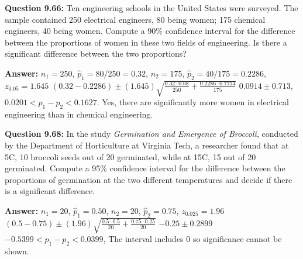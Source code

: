 \documentclass{article}
\begin{document}
\textbf{Question 9.66:}
Ten engineering schools in the United States
were surveyed. The sample contained 250 electrical
engineers, 80 being women; 175 chemical engineers, 40
being women. Compute a 90\% confidence interval for
the difference between the proportions of women in
these two fields of engineering. Is there a significant
difference between the two proportions?
\begin{description}
    \item \textbf{Answer:} $n_1=250$, $\hat{p}_1=80/250=0.32$, $n_2=175$, $\hat{p}_2=40/175=0.2286$, $z_{0.05}=1.645$\newline
    $(0.32-0.2286)\pm(1.645)\sqrt{\frac{0.32\cdot 0.68}{250}+\frac{0.2286\cdot 0.7714}{175}}$\newline
    $0.0914\pm 0.713$, \newline
    \boldmath$0.0201 < p_1 - p_2 < 0.1627$. Yes, there are significantly more women
    in electrical engineering than in chemical engineering.
\end{description}

\textbf{Question 9.68:}
In the study \textit{Germination and Emergence of
Broccoli}, conducted by the Department of Horticulture
at Virginia Tech, a researcher found that at 5\textdegree C, 10
broccoli seeds out of 20 germinated, while at 15\textdegree C, 15
out of 20 germinated. Compute a 95\% confidence interval 
for the difference between the proportions of germination 
at the two different temperatures and decide if there is a 
significant difference.
\begin{description}
    \item \textbf{Answer:} $n_1=20$, $\hat{p}_1=0.50$, $n_2=20$, $\hat{p}_2=0.75$, $z_{0.025}=1.96$\newline
    $(0.5-0.75)\pm (1.96)\sqrt{\frac{0.5\cdot 0.5}{20} + \frac{0.75\cdot 0.25}{20}}$\newline
    $-0.25\pm 0.2899$\newline
    \boldmath$-0.5399 < p_1 - p_2 < 0.0399$, The interval includes 0 so 
    significance cannot be shown.
\end{description}
\end{document}
